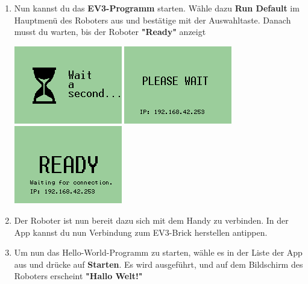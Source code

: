 \documentclass[
	12pt,
	colorbacktitle,
	accentcolor=tud1c,
	draft,
	twoside,
	german
]{tudexercise}
\begin{document}
\begin{enumerate}
	
	\item \label{sec:afterpan}Nun kannst du das \textbf{EV3-Programm }starten. Wähle dazu \textbf{Run Default} im Hauptmenü des Roboters aus und bestätige mit der Auswahltaste. Danach musst du warten, bis der Roboter \textbf{"Ready"} anzeigt
	
	\includegraphics[width=.3\textwidth]{img/ev3_waitasecond.png}
	\includegraphics[width=.3\textwidth]{img/ev3_pleasewait.png}	
	\includegraphics[width=.3\textwidth]{img/ev3_ready.png}
	\item Der Roboter ist nun bereit dazu sich mit dem Handy zu verbinden. In der App kannst du nun \glqq Verbindung zum EV3-Brick herstellen\grqq{} antippen.
	\item Um nun das Hello-World-Programm zu starten, wähle es in der Liste der App aus und drücke auf \textbf{Starten}. Es wird ausgeführt, und auf dem Bildschirm des Roboters erscheint \textbf{"Hallo Welt!"}
	
	\end{enumerate}	
	\newpage
\end{document}
